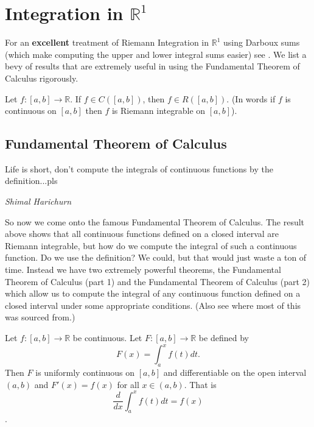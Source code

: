 \chapter{Integration in $\mathbb{R}^1$}
	
	For an \textbf{excellent} treatment of Riemann Integration in $\mathbb{R}^1$ using Darboux sums (which make computing the upper and lower integral sums easier) see \cite{math310notes}. We list a bevy of results that are extremely useful in using the Fundamental Theorem of Calculus rigorously.
	
	
	
	\begin{theorem}
		Let $f : [a, b] \to \mathbb{R}$. If $f \in C\left( [a, b]\right)$, then $f \in R\left( [a, b]\right)$. (In words if $f$ is continuous on $[a, b]$ then $f$ is Riemann integrable on $[a, b]$).
	\end{theorem}
	
	
	
	\section{Fundamental Theorem of Calculus}
	
	\epigraph{Life is short, don't compute the integrals of continuous functions by the definition...pls}{\textit{Shimal Harichurn}} 
	
	So now we come onto the famous Fundamental Theorem of Calculus. The result above shows that all continuous functions defined on a closed interval are Riemann integrable, but how do we compute the integral of such a continuous function. Do we use the definition? We could, but that would just waste a ton of time. Instead we have two extremely powerful theorems, the Fundamental Theorem of Calculus (part 1) and the Fundamental Theorem of Calculus (part 2) which allow us to compute the integral of any continuous function defined on a closed interval under some appropriate conditions. (Also see \cite{wiki:xxx} where most of this was sourced from.)
	
	\begin{theorem}
		Let $f : [a, b] \to \mathbb{R}$ be continuous. Let $F : [a, b] \to \mathbb{R}$ be defined by $$F(x) = \int_{a}^x f(t) dt.$$ Then $F$ is uniformly continuous on $[a, b]$ and differentiable on the open interval $(a, b)$ and $F'(x) = f(x)$ for all $x \in (a, b)$. That is $$\frac{d}{dx} \int_{a}^x f(t) dt = f(x)$$.
	\end{theorem}
	
